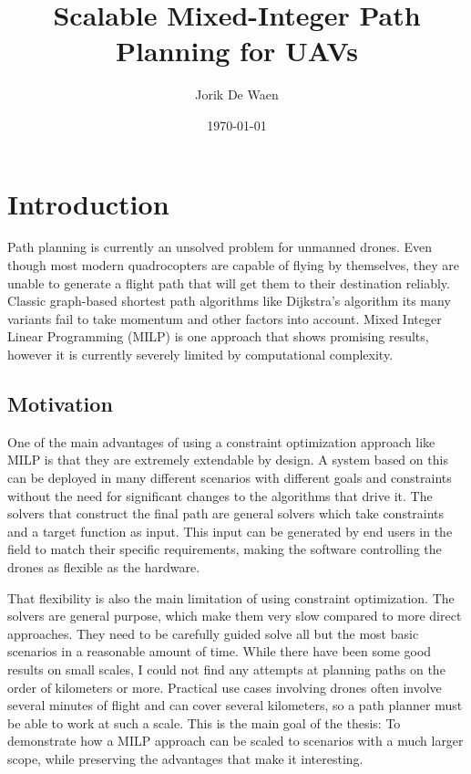 \documentclass[12pt]{article}
\title{Scalable Mixed-Integer Path Planning for UAVs}
\author{Jorik De Waen}
\date{\today}
\begin{document}
\maketitle

\section{Introduction}
Path planning is currently an unsolved problem for unmanned drones. Even though most modern quadrocopters are capable of flying by themselves, they are unable to generate a flight path that will get them to their destination reliably. Classic graph-based shortest path algorithms like Dijkstra's algorithm its many variants fail to take momentum and other factors into account. Mixed Integer Linear Programming (MILP) is one approach that shows promising results, however it is currently severely limited by computational complexity.


\subsection{Motivation}
One of the main advantages of using a constraint optimization approach like MILP is that they are extremely extendable by design. A system based on this can be deployed in many different scenarios with different goals and constraints without the need for significant changes to the algorithms that drive it. The solvers that construct the final path are general solvers which take constraints and a target function as input. This input can be generated by end users in the field to match their specific requirements, making the software controlling the drones as flexible as the hardware.
\par
That flexibility is also the main limitation of using constraint optimization. The solvers are general purpose, which make them very slow compared to more direct approaches. They need to be carefully guided solve all but the most basic scenarios in a reasonable amount of time. While there have been some good results on small scales, I could not find any attempts at planning paths on the order of kilometers or more. Practical use cases involving drones often involve several minutes of flight and can cover several kilometers, so a path planner must be able to work at such a scale. This is the main goal of the thesis: To demonstrate how a MILP approach can be scaled to scenarios with a much larger scope, while preserving the advantages that make it interesting.
\end{document}
